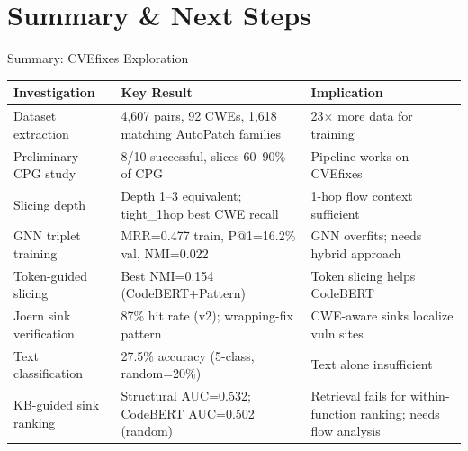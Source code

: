 \documentclass[aspectratio=169,10pt]{beamer}
\begin{document}
\section{Summary \& Next Steps}

\begin{frame}{Summary: CVEfixes Exploration}

  \centering
  \vspace{0.5em}
  {\small
  \renewcommand{\arraystretch}{1.35}
  \setlength{\tabcolsep}{4pt}
  \begin{tabular}{p{3.5cm}p{4.0cm}p{4.5cm}}
    \toprule
    \textbf{Investigation} & \textbf{Key Result} & \textbf{Implication} \\
    \midrule
    Dataset extraction & 4,607 pairs, 92 CWEs, 1,618 matching AutoPatch families
      & 23$\times$ more data for training \\
    \midrule
    Preliminary CPG study & 8/10 successful, slices 60–90\% of CPG
      & Pipeline works on CVEfixes \\
    \midrule
    Slicing depth & Depth 1–3 equivalent; tight\_1hop best CWE recall
      & 1-hop flow context sufficient \\
    \midrule
    GNN triplet training & MRR=0.477 train, P@1=16.2\% val, NMI=0.022
      & GNN overfits; needs hybrid approach \\
    \midrule
    Token-guided slicing & Best NMI=0.154 (CodeBERT+Pattern)
      & Token slicing helps CodeBERT \\
    \midrule
    Joern sink verification & 87\% hit rate (v2); wrapping-fix pattern
      & CWE-aware sinks localize vuln sites \\
    \midrule
    Text classification & 27.5\% accuracy (5-class, random=20\%)
      & Text alone insufficient \\
    \midrule
    KB-guided sink ranking & Structural AUC=0.532; CodeBERT AUC=0.502 (random)
      & Retrieval fails for within-function ranking; needs flow analysis \\
    \bottomrule
  \end{tabular}}

\end{frame}
\end{document}
